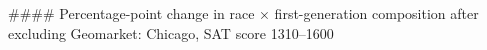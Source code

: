 #### Percentage-point change in race × first-generation composition after excluding Geomarket: Chicago, SAT score 1310–1600
